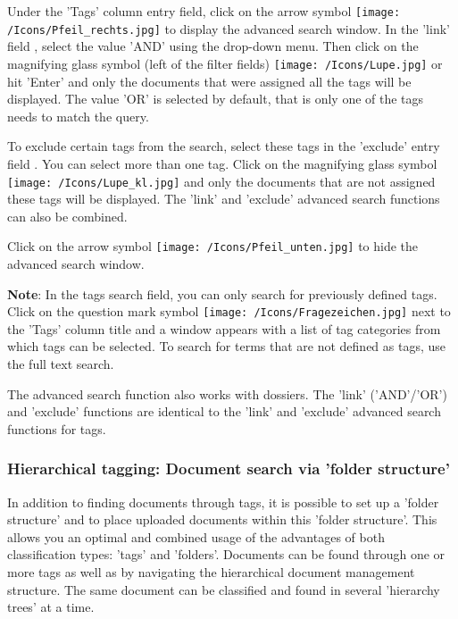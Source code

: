 Under the 'Tags' column entry field, click on the arrow symbol \texttt{[image: /Icons/Pfeil\_rechts.jpg]}  to display the advanced search window. In the 'link' field , select the value 'AND'  using the drop-down menu. Then click on the magnifying glass symbol (left of the filter fields) \texttt{[image: /Icons/Lupe.jpg]}   or hit 'Enter' and only the documents that were assigned all the tags will be displayed. The value 'OR' is selected by default, that is only one of the tags needs to match the query. \newline

To exclude certain tags from the search, select these tags in the 'exclude' entry field . You can select more than one tag. Click on the magnifying glass symbol \texttt{[image: /Icons/Lupe\_kl.jpg]} and only the documents that are not assigned these tags will be displayed. The 'link' and 'exclude' advanced search functions can also be combined.

\vspace{\baselineskip}

Click on the arrow symbol \texttt{[image: /Icons/Pfeil\_unten.jpg]}  to hide the advanced search window.

\vspace{\baselineskip}

\textbf{Note}: In the tags search field, you can only search for previously defined tags. Click on the question mark symbol \texttt{[image: /Icons/Fragezeichen.jpg]} next to the 'Tags' column title and a window appears with a list of tag categories from which tags can be selected. To search for terms that are not defined as tags, use the full text search.

\vspace{\baselineskip}

The advanced search function also works with dossiers. The 'link' ('AND'/'OR') and 'exclude' functions are identical to the 'link' and 'exclude' advanced search functions for tags.

\subsubsection{Hierarchical tagging: Document search via 'folder structure'}

In addition to finding documents through tags, it is possible to set up a 'folder structure' and to place uploaded documents within this 'folder structure'. This allows you an optimal and combined usage of the advantages of both classification types: 'tags' and 'folders'. Documents can be found through one or more tags as well as by navigating the hierarchical document management structure. The same document can be classified and found in several 'hierarchy trees' at a time.

